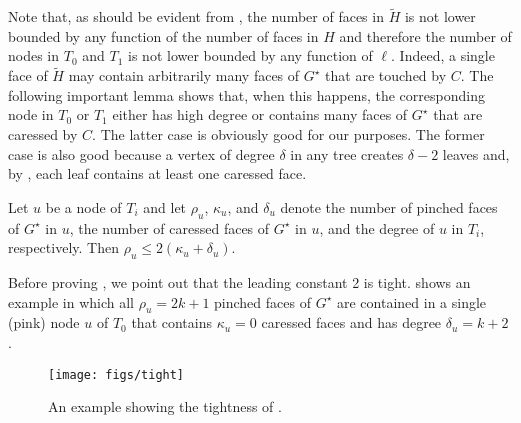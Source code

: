 \documentclass{patmorin}
\newcommand{\dual}[1]{{#1}^\star}
\begin{document}
Note that, as should be evident from , the number of faces in $\tilde{H}$ is not lower bounded by any function of the number of faces in $H$ and therefore the number of nodes in $T_0$ and $T_1$ is not lower bounded by any function of $\ell$.  Indeed, a single face of $\tilde{H}$ may contain arbitrarily many faces of $\dual{G}$ that are touched by $C$.  The following important lemma shows that, when this happens, the corresponding node in $T_0$ or $T_1$ either has high degree or contains many faces of $\dual{G}$ that are caressed by $C$.  The latter case is obviously good for our purposes. The former case is also good because a vertex of degree $\delta$ in any tree creates $\delta-2$ leaves and, by , each leaf contains at least one caressed face.


\begin{lem}
   Let $u$ be a node of $T_i$ and let $\rho_u$, $\kappa_u$, and $\delta_u$ denote the number of pinched faces of $\dual{G}$ in $u$, the number of caressed faces of $\dual{G}$ in $u$, and the degree of $u$ in $T_i$, respectively.  Then $\rho_u \le 2(\kappa_u+\delta_u)$.
\end{lem}

Before proving , we point out that
the leading constant 2 is tight.  shows an example in
which all $\rho_u=2k+1$ pinched faces of $\dual{G}$ are contained in a
single (pink) node $u$ of $T_0$ that contains $\kappa_u=0$ caressed faces and
has degree $\delta_u=k+2$.

\begin{figure}
  \begin{center}
    \texttt{[image: figs/tight]}
  \end{center}
  \caption{An example showing the tightness of .}
\end{figure}

\end{document}
